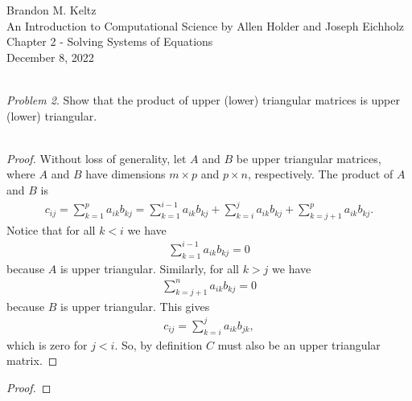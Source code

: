 \documentclass{article}
\begin{document}
	
	\begin{flushleft}	
	
		Brandon M. Keltz\\
		An Introduction to Computational Science by Allen Holder and Joseph Eichholz\\
		Chapter 2 - Solving Systems of Equations\\
		December 8, 2022\\\
		
		\textit{Problem 2}. Show that the product of upper (lower) triangular matrices is upper (lower) triangular. \\\
		
		\begin{proof}
		
			Without loss of generality, let $A$ and $B$ be upper triangular matrices, where $A$ and $B$ have dimensions $m \times p$ and $p \times n$, respectively. The product of $A$ and $B$ is
			\begin{align*}
				c_{ij} = \sum_{k = 1}^p a_{ik} b_{kj} = \sum_{k = 1}^{i - 1} a_{ik} b_{kj} + \sum_{k = i}^j a_{ik} b_{kj} + \sum_{k = j + 1}^p a_{ik} b_{kj}.
			\end{align*}
			Notice that for all $k < i$ we have
			\begin{align*}
				\sum_{k = 1}^{i - 1} a_{ik} b_{kj} = 0
			\end{align*}
			because $A$ is upper triangular. Similarly, for all $k > j$ we have
			\begin{align*}
				\sum_{k = j + 1}^n a_{ik} b_{kj} = 0
			\end{align*}
			because $B$ is upper triangular. This gives 
			\begin{align*}
				c_{ij} = \sum_{k = i}^j a_{ik} b_{jk},
			\end{align*}
			which is zero for $j < i$. So, by definition $C$ must also be an upper triangular matrix.			
		
		\end{proof}

		\begin{proof}
		

\end{proof}
\end{flushleft}
\end{document}

